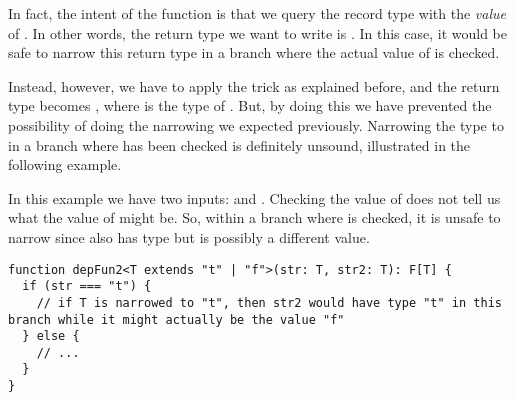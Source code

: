 In fact, the intent of the function is that we query the record type  with the \emph{value} of . In other words, the return type we want to write is . In this case, it would be safe to narrow this return type in a branch where the actual value of  is checked.

Instead, however, we have to apply the trick as explained before, and the return type becomes , where  is the type of . But, by doing this we have prevented the possibility of doing the narrowing we expected previously. Narrowing the type  to  in a branch where  has been checked is definitely unsound, illustrated in the following example.

In this example we have two inputs:  and . Checking the value of  does not tell us what the value of  might be. So, within a branch where  is checked, it is unsafe to narrow  since  also has type  but is possibly a different value.

\begin{lstlisting}
function depFun2<T extends "t" | "f">(str: T, str2: T): F[T] {
  if (str === "t") {
    // if T is narrowed to "t", then str2 would have type "t" in this branch while it might actually be the value "f"
  } else {
    // ...
  }
}
\end{lstlisting}

